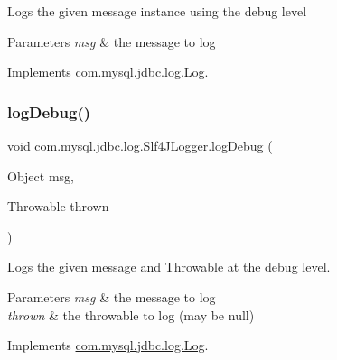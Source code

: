 Logs the given message instance using the \textquotesingle{}debug\textquotesingle{} level


\begin{DoxyParams}{Parameters}
{\em msg} & the message to log \\
\hline
\end{DoxyParams}


Implements \mbox{\hyperlink{interfacecom_1_1mysql_1_1jdbc_1_1log_1_1_log_aa6f1e099156b6a444addba331704c2fe}{com.\+mysql.\+jdbc.\+log.\+Log}}.

\mbox{\label{classcom_1_1mysql_1_1jdbc_1_1log_1_1_slf4_j_logger_a5a4a9cb3c82f4ba2b8342bd3ae8c56ce}} 
\subsubsection{\texorpdfstring{log\+Debug()}{logDebug()}\hspace{0.1cm}{\footnotesize\ttfamily [2/2]}}
{\footnotesize\ttfamily void com.\+mysql.\+jdbc.\+log.\+Slf4\+J\+Logger.\+log\+Debug (\begin{DoxyParamCaption}\item[{Object}]{msg,  }\item[{Throwable}]{thrown }\end{DoxyParamCaption})}

Logs the given message and Throwable at the \textquotesingle{}debug\textquotesingle{} level.


\begin{DoxyParams}{Parameters}
{\em msg} & the message to log \\
\hline
{\em thrown} & the throwable to log (may be null) \\
\hline
\end{DoxyParams}


Implements \mbox{\hyperlink{interfacecom_1_1mysql_1_1jdbc_1_1log_1_1_log_ae11c12bcf67d9681ab03e97b9098d28d}{com.\+mysql.\+jdbc.\+log.\+Log}}.

\mbox{\label{classcom_1_1mysql_1_1jdbc_1_1log_1_1_slf4_j_logger_a3f95d26aa1dfc7988d06649979541ef1}} 
